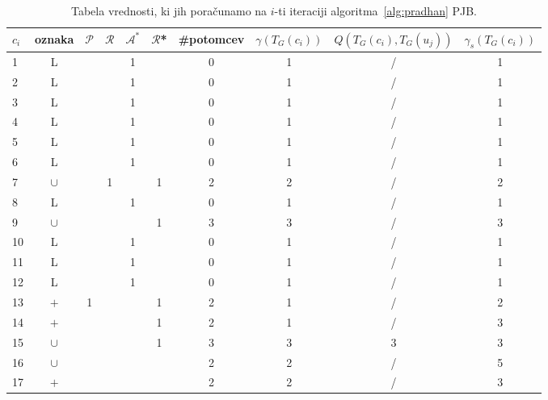 \documentclass[12pt,a4paper,twoside]{article}
\theoremstyle{definition} %
\theoremstyle{plain} %
\numberwithin{equation}{section}  %
\begin{document}
\begin{table}[h!]
\begin{adjustbox}{width=\columnwidth,center}
\begin{tabular}{l|ccccccccc}
$c_i$   & oznaka  &  $\mathcal{P}$  & $\mathcal{R}$ & $\mathcal{A}^*$ &  $\mathcal{R}$* & \#potomcev & $\gamma(T_G(c_i))$ & $Q(T_G(c_i), T_G(u_j))$ & $\gamma_s(T_G(c_i))$ \\ \hline
1  & L      &      &              & 1  &    & 0          & 1       & /  & 1       \\\hline
2  & L      &      &              & 1  &    & 0          & 1       &  / & 1       \\\hline
3  & L      &      &              & 1  &    & 0          & 1       & /  & 1       \\\hline
4  & L      &      &              & 1  &    & 0          & 1       & /  & 1       \\\hline
5  & L      &      &              & 1  &    & 0          & 1       & /  & 1       \\\hline
6  & L      &      &              & 1  &    & 0          & 1       & /  & 1       \\\hline
7  & $\cup$ &      & 1            &    & 1  & 2          & 2       & /  & 2       \\\hline
8  & L      &      &              & 1  &    & 0          & 1       & /  & 1       \\\hline
9  & $\cup$ &      &              &    & 1  & 3          & 3       & /  & 3       \\\hline
10 & L      &      &              & 1  &    & 0          & 1       & /  & 1       \\\hline
11 & L      &      &              & 1  &    & 0          & 1       & /  & 1       \\\hline
12 & L      &      &              & 1  &    & 0          & 1       & /  & 1       \\\hline
13 & $+$    & 1 &              &    & 1  & 2          & 1       & /  & 2       \\\hline
14 & $+$    &      &              &    & 1  & 2          & 1       & /  & 3       \\\hline
15 & $\cup$ &      &              &    & 1  & 3          & 3       & 3 & 3       \\\hline
16 & $\cup$ &      &              &    &    & 2          & 2       & /  & 5       \\\hline
17 & $+$    &      &              &    &    & 2          & 2       & /  & 3      
\end{tabular}
\end{adjustbox}
\caption{\label{tab:tabela pradhan}Tabela vrednosti, ki jih poračunamo na $i$-ti iteraciji algoritma~\ref{alg:pradhan} PJB.}
\end{table}
\end{document}
